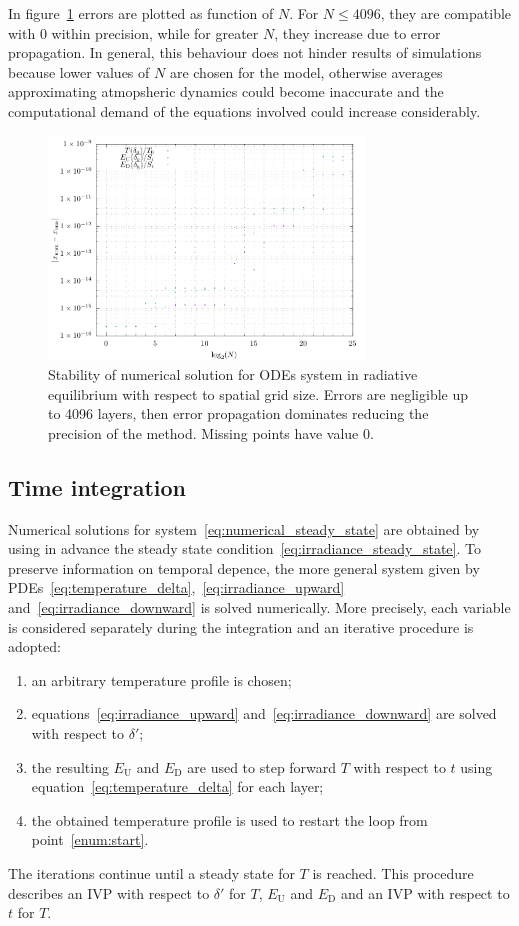 \documentclass[a4paper,10pt,twocolumn,\classoptions]{article}
\begin{document}
In figure~\ref{fig:stability} errors are plotted as function of $N$. For $N \leq 4096$, they are compatible with 0 within precision, while for greater $N$, they increase due to error propagation. In general, this behaviour does not hinder results of simulations because lower values of $N$ are chosen for the model, otherwise averages approximating atmopsheric dynamics could become inaccurate and the computational demand of the equations involved could increase considerably.
\begin{figure}[h]
  \centering
  \includegraphics*[keepaspectratio=true,width=0.75\textwidth]{stability}
  \caption{Stability of numerical solution for ODEs system in radiative equilibrium with respect to spatial grid size. Errors are negligible up to \num{4096} layers, then error propagation dominates reducing the precision of the method. Missing points have value 0.}
  \label{fig:stability}
\end{figure}



\subsection{Time integration}
\label{sec:Time integration}
Numerical solutions for system~\eqref{eq:numerical_steady_state} are obtained by using in advance the steady state condition~\eqref{eq:irradiance_steady_state}. To preserve information on temporal depence, the more general system given by PDEs~\eqref{eq:temperature_delta},~\eqref{eq:irradiance_upward} and~\eqref{eq:irradiance_downward} is solved numerically.
More precisely, each variable is considered separately during the integration and an iterative procedure is adopted:
\begin{enumerate}
  \item an arbitrary temperature profile is chosen;
  \item \label{enum:start} equations~\eqref{eq:irradiance_upward} and~\eqref{eq:irradiance_downward} are solved with respect to $\delta'$;
  \item the resulting $E_\text{U}$ and $E_\text{D}$ are used to step forward $T$ with respect to $t$ using equation~\eqref{eq:temperature_delta} for each layer;
  \item the obtained temperature profile is used to restart the loop from point~\ref{enum:start}.
\end{enumerate}
The iterations continue until a steady state for $T$ is reached. This procedure describes an IVP with respect to $\delta'$ for $T$, $E_\text{U}$ and $E_\text{D}$ and an IVP with respect to $t$ for $T$.
\end{document}
